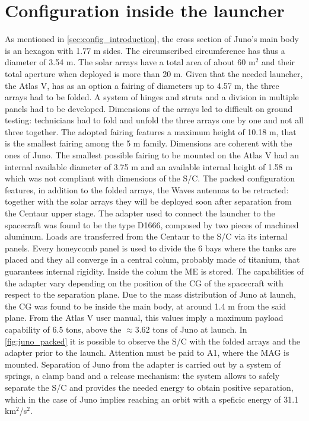 \section{Configuration inside the launcher}
\label{sec:config_launcher}

As mentioned in \autoref{sec:config_introduction}, the cross section of Juno's main body is an hexagon with 1.77 m sides. The circumscribed circumference has thus a diameter of 3.54 m. The solar arrays have a total area of about 60 m$^2$ and their total aperture when deployed is more than 20 m.\cite{masses_ref} Given that the needed launcher, the Atlas V, has as an option a fairing of diameters up to 4.57 m, the three arrays had to be folded. A system of hinges and struts and a division in multiple panels had to be developed.\cite{solar_panels_coef} Dimensions of the arrays led to difficult on ground testing: technicians had to fold and unfold the three arrays one by one and not all three together.\cite{solar_panels_testing} The adopted fairing features a maximum height of 10.18 m, that is the smallest fairing among the 5 m family\cite{atlas_manual}. Dimensions are coherent with the ones of Juno. The smallest possible fairing to be mounted on the Atlas V had an internal available diameter of 3.75 m 
and an available internal height of 1.58 m which was not compliant with dimensions of the S/C. 
The packed configuration features, in addition to the folded arrays, the Waves antennas to be retracted: together with the solar arrays they will be deployed soon after separation from the Centaur upper stage. The adapter used to connect the launcher to the spacecraft was found to be the type D1666, composed by two pieces of machined aluminum. Loads are transferred from the Centaur to the S/C via its internal panels. Every honeycomb panel is used to divide the 6 bays where the tanks are placed and they all converge in a central colum, probably made of titanium, that guarantees internal rigidity. Inside the colum the ME is stored. The capabilities of the adapter vary depending on the position of the CG of the spacecraft with respect to the separation plane. Due to the mass distribution of Juno at launch, the CG was found to be inside the main body, at around 1.4 m from the said plane. From the Atlas V user manual\cite{atlas_manual}, this values imply a maximum payload capability of 6.5 tons, above the $\approx 3.62$ tons of Juno at launch.\cite{masses_ref}
In \autoref{fig:juno_packed}\cite{foto_fairing} it is possible to observe the S/C with the folded arrays and the adapter prior to the launch. Attention must be paid to A1, where the MAG is mounted. 
Separation of Juno from the adapter is carried out by a system of springs, a clamp band and a release mechanism: the system allows to safely separate the S/C and provides the needed energy to obtain positive separation, which in the case of Juno implies reaching an orbit with a speficic energy of 31.1 km$^2$/s$^2$. 

